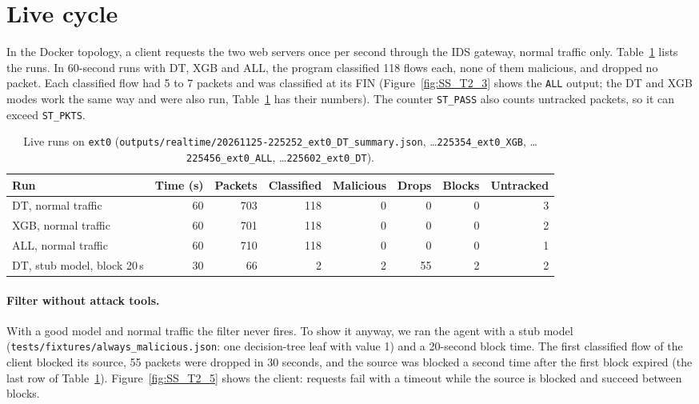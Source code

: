 \section{Live cycle}\label{sec:live}
In the Docker topology, a client requests the two web servers once per second through the IDS gateway, normal traffic only. Table~\ref{tab:live} lists the runs. In 60-second runs with DT, XGB and ALL, the program classified 118 flows each, none of them malicious, and dropped no packet. Each classified flow had 5 to 7 packets and was classified at its FIN (Figure~\ref{fig:SS_T2_3} shows the \texttt{ALL} output; the DT and XGB modes work the same way and were also run, Table~\ref{tab:live} has their numbers). The counter \texttt{ST\_PASS} also counts untracked packets, so it can exceed \texttt{ST\_PKTS}.

\begin{table}[htb]
\centering\small
\begin{tabular}{@{}lrrrrrrr@{}}
\toprule
Run & Time (s) & Packets & Classified & Malicious & Drops & Blocks & Untracked \\
\midrule
DT, normal traffic & 60 & 703 & 118 & 0 & 0 & 0 & 3 \\
XGB, normal traffic & 60 & 701 & 118 & 0 & 0 & 0 & 2 \\
ALL, normal traffic & 60 & 710 & 118 & 0 & 0 & 0 & 1 \\
DT, stub model, block 20\,s & 30 & 66 & 2 & 2 & 55 & 2 & 2 \\
\bottomrule
\end{tabular}
\caption{Live runs on \texttt{ext0} (\texttt{outputs/realtime/20261125-225252\_ext0\_DT\_summary.json}, \ldots\texttt{225354\_ext0\_XGB}, \ldots\texttt{225456\_ext0\_ALL}, \ldots\texttt{225602\_ext0\_DT}).}\label{tab:live}
\end{table}


\paragraph{Filter without attack tools.} With a good model and normal traffic the filter never fires. To show it anyway, we ran the agent with a stub model (\texttt{tests/fixtures/always\_malicious.json}: one decision-tree leaf with value 1) and a 20-second block time. The first classified flow of the client blocked its source, 55 packets were dropped in 30 seconds, and the source was blocked a second time after the first block expired (the last row of Table~\ref{tab:live}). Figure~\ref{fig:SS_T2_5} shows the client: requests fail with a timeout while the source is blocked and succeed between blocks.

